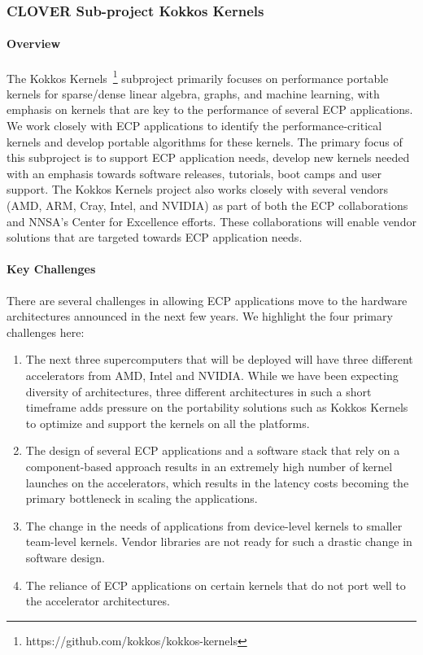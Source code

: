 \subsubsection{CLOVER Sub-project Kokkos Kernels} 
\paragraph{Overview} 
The Kokkos Kernels~\footnote{https://github.com/kokkos/kokkos-kernels} subproject primarily focuses on performance portable kernels
for sparse/dense linear algebra, graphs, and machine learning, with emphasis on
kernels that are key to the performance of
several ECP applications. We work closely with ECP applications to identify the
performance-critical kernels and develop portable algorithms for these kernels.
The primary focus of this subproject is to support ECP application needs, develop new
kernels needed with an emphasis towards software releases, tutorials, boot camps
and user support. The Kokkos Kernels project also works closely with several vendors
(AMD, ARM, Cray, Intel, and NVIDIA) as part of both the ECP collaborations and
NNSA's Center for Excellence efforts. These collaborations will  enable vendor solutions
that are targeted towards ECP application needs.

\paragraph{Key  Challenges}
There are several challenges in allowing ECP applications move to the hardware architectures
announced in the next few years. We highlight the four primary challenges here:
\begin{enumerate}
\item 
The next three supercomputers that will be deployed will have
three different accelerators from AMD, Intel and NVIDIA. While we have been expecting diversity of architectures, three
different architectures in such a short timeframe adds pressure on the portability
solutions such as Kokkos Kernels to optimize and support the kernels on all the platforms.
\item
The design of several ECP applications and a software stack that rely on a component-based
approach results in an extremely high number of kernel launches on the accelerators, which
results in the latency costs becoming the primary bottleneck in scaling the applications.
\item
The change in the needs of applications from device-level kernels to smaller team-level kernels. Vendor
libraries are not ready for such a drastic change in software design.
\item 
The reliance of ECP applications on certain kernels that do not port well to the  accelerator architectures.
\end{enumerate}

